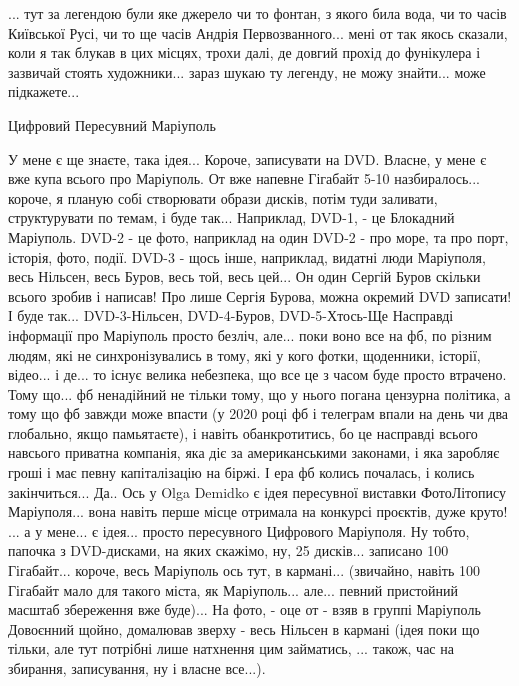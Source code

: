 

... тут за легендою були яке джерело чи то фонтан, з якого била вода, чи то
часів Київської Русі, чи то ще часів Андрія Первозванного... мені от так якось
сказали, коли я так блукав в цих місцях, трохи далі, де довгий прохід до
фунікулера і зазвичай стоять художники... зараз шукаю ту легенду, не можу
знайти... може підкажете...

Цифровий Пересувний Маріуполь 

У мене є ще знаєте, така ідея... Короче, записувати на DVD. Власне, у мене є
вже купа всього про Маріуполь. От вже напевне Гігабайт 5-10 назбиралось...
короче, я планую собі створювати образи дисків, потім туди заливати,
структурувати по темам, і буде так... Наприклад, DVD-1, - це Блокадний
Маріуполь. DVD-2 - це фото, наприклад на один DVD-2 - про море, та про порт,
історія, фото, події.  DVD-3 - щось інше, наприклад, видатні люди Маріуполя,
весь Нільсен, весь Буров, весь той, весь цей... Он один Сергій Буров скільки
всього зробив і написав! Про лише Сергія Бурова, можна окремий DVD записати! І
буде так... DVD-3-Нільсен, DVD-4-Буров, DVD-5-Хтось-Ще Насправді інформації про
Маріуполь просто безліч, але... поки воно все на фб, по різним людям, які не
синхронізувались в тому, які у кого фотки, щоденники, історії, відео... і де...
то існує велика небезпека, що все це з часом буде просто втрачено. Тому що...
фб ненадійний не тільки тому, що у нього погана цензурна політика, а тому що фб
завжди може впасти (у 2020 році фб і телеграм впали на день чи два глобально,
якщо памьятаєте), і навіть обанкротитись, бо це насправді всього навсього
приватна компанія, яка діє за американськими законами, і яка заробляє гроші і
має певну капіталізацію на біржі. І ера фб колись почалась, і колись
закінчиться... Да..  Ось у Olga Demidko є ідея пересувної виставки ФотоЛітопису
Маріуполя... вона навіть перше місце отримала на конкурсі проєктів, дуже круто!
... а у мене... є ідея... просто пересувного Цифрового Маріуполя. Ну тобто,
папочка з DVD-дисками, на яких скажімо, ну, 25 дисків... записано 100
Гігабайт... короче, весь Маріуполь ось тут, в кармані... (звичайно, навіть 100
Гігабайт мало для такого міста, як Маріуполь... але... певний пристойний
масштаб збереження вже буде)... На фото, - оце от - взяв в группі Маріуполь
Довоєнний щойно, домалював зверху - весь Нільсен в кармані (ідея поки що
тільки, але тут потрібні лише натхнення цим займатись, ... також, час на
збирання, записування, ну і власне все...).

